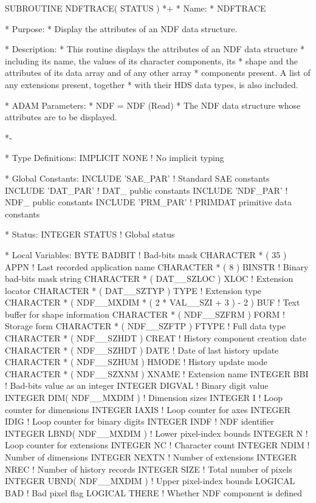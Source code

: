 \documentclass[twoside,11pt,nolof]{starlink}
\begin{document}
\small
\begin{terminalv}
      SUBROUTINE NDFTRACE( STATUS )
*+
*  Name:
*     NDFTRACE

*  Purpose:
*     Display the attributes of an NDF data structure.

*  Description:
*     This routine displays the attributes of an NDF data structure
*     including its name, the values of its character components, its
*     shape and the attributes of its data array and of any other array
*     components present. A list of any extensions present, together
*     with their HDS data types, is also included.

*  ADAM Parameters:
*     NDF = NDF (Read)
*        The NDF data structure whose attributes are to be displayed.

*-

*  Type Definitions:
      IMPLICIT NONE              ! No implicit typing

*  Global Constants:
      INCLUDE 'SAE_PAR'          ! Standard SAE constants
      INCLUDE 'DAT_PAR'          ! DAT_ public constants
      INCLUDE 'NDF_PAR'          ! NDF_ public constants
      INCLUDE 'PRM_PAR'          ! PRIMDAT primitive data constants

*  Status:
      INTEGER STATUS             ! Global status

*  Local Variables:
      BYTE BADBIT                ! Bad-bits mask
      CHARACTER * ( 35 ) APPN    ! Last recorded application name
      CHARACTER * ( 8 ) BINSTR   ! Binary bad-bits mask string
      CHARACTER * ( DAT__SZLOC ) XLOC ! Extension locator
      CHARACTER * ( DAT__SZTYP ) TYPE ! Extension type
      CHARACTER * ( NDF__MXDIM * ( 2 * VAL__SZI + 3 ) - 2 ) BUF
                                 ! Text buffer for shape information
      CHARACTER * ( NDF__SZFRM ) FORM ! Storage form
      CHARACTER * ( NDF__SZFTP ) FTYPE ! Full data type
      CHARACTER * ( NDF__SZHDT ) CREAT ! History component creation date
      CHARACTER * ( NDF__SZHDT ) DATE ! Date of last history update
      CHARACTER * ( NDF__SZHUM ) HMODE ! History update mode
      CHARACTER * ( NDF__SZXNM ) XNAME ! Extension name
      INTEGER BBI                ! Bad-bits value as an integer
      INTEGER DIGVAL             ! Binary digit value
      INTEGER DIM( NDF__MXDIM )  ! Dimension sizes
      INTEGER I                  ! Loop counter for dimensions
      INTEGER IAXIS              ! Loop counter for axes
      INTEGER IDIG               ! Loop counter for binary digits
      INTEGER INDF               ! NDF identifier
      INTEGER LBND( NDF__MXDIM ) ! Lower pixel-index bounds
      INTEGER N                  ! Loop counter for extensions
      INTEGER NC                 ! Character count
      INTEGER NDIM               ! Number of dimensions
      INTEGER NEXTN              ! Number of extensions
      INTEGER NREC               ! Number of history records
      INTEGER SIZE               ! Total number of pixels
      INTEGER UBND( NDF__MXDIM ) ! Upper pixel-index bounds
      LOGICAL BAD                ! Bad pixel flag
      LOGICAL THERE              ! Whether NDF component is defined


\end{terminalv}
\end{document}
